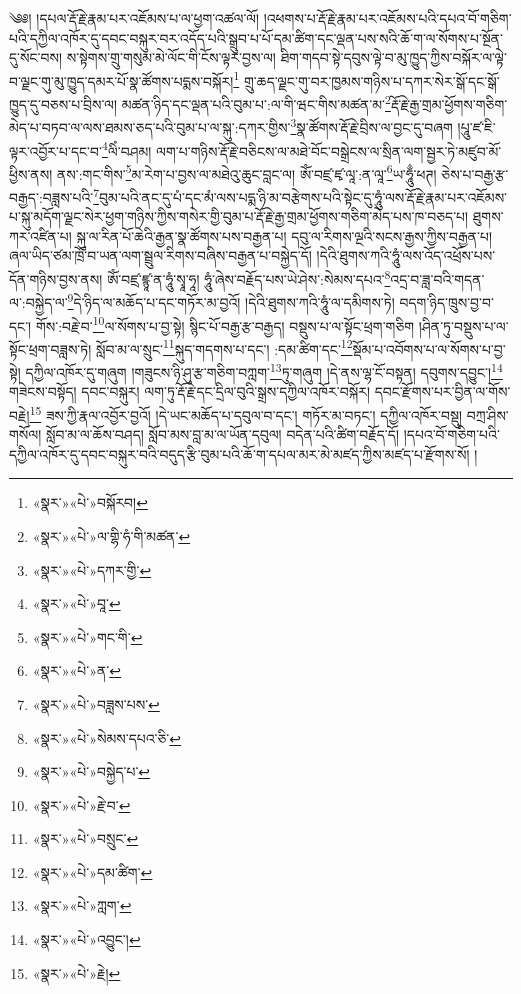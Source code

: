 ༄༅། །དཔལ་རྡོ་རྗེ་རྣམ་པར་འཇོམས་པ་ལ་ཕྱག་འཚལ་ལོ། །འཕགས་པ་རྡོ་རྗེ་རྣམ་པར་འཇོམས་པའི་དཔའ་བོ་གཅིག་པའི་དཀྱིལ་འཁོར་དུ་དབང་བསྐུར་བར་འདོད་པའི་སྒྲུབ་པ་པོ་དམ་ཚིག་དང་ལྡན་པས་སའི་ཆོ་ག་ལ་སོགས་པ་སྔོན་དུ་སོང་བས། ས་སྟེགས་གྲུ་གསུམ་མེ་ལོང་གི་ངོས་ལྟར་བྱས་ལ། ཐིག་གདབ་སྟེ་དབུས་ལྟེ་བ་མུ་ཁྱུད་ཀྱིས་བསྐོར་ལ་ལྟེ་བ་ལྗང་གུ་མུ་ཁྱུད་དམར་པོ་སྣ་ཚོགས་པདྨས་བསྐོར།\footnote{«སྣར་»«པེ་»བསྐོརབ།} གྲུ་ཆད་ལྗང་གུ་བར་ཁྱམས་གཉིས་པ་དཀར་སེར་སྒོ་དང་སྒོ་ཁྱུད་དུ་བཅས་པ་བྲིས་ལ། མཚན་ཉིད་དང་ལྡན་པའི་བུམ་པ་:ལ་གི་ཝང་གིས་མཚན་མ་\footnote{«སྣར་»«པེ་»ལ་གྷི་ཧཾ་གི་མཚན་}རྡོ་རྗེ་རྒྱ་གྲམ་ཕྱོགས་གཅིག་མེད་པ་བཏབ་ལ་ལས་ཐམས་ཅད་པའི་བུམ་པ་ལ་སྐུ་:དཀར་གྱིས་\footnote{«སྣར་»«པེ་»དཀར་གྱི་}སྣ་ཚོགས་རྡོ་རྗེ་བྲིས་ལ་བྱང་དུ་བཞག །པཱུ་ཛ་ཇི་ལྟར་འབྱོར་པ་དང་བ་\footnote{«སྣར་»«པེ་»བཱ་}ལིཾ་བཤམ། ལག་པ་གཉིས་རྡོ་རྗེ་བཅིངས་ལ་མཐེ་བོང་བསྒྲེངས་ལ་སྲིན་ལག་སྦྱར་ཏེ་མཛུབ་མོ་ཕྱིས་ནས། ནས་:གང་གིས་\footnote{«སྣར་»«པེ་»གང་གི་}མ་རེག་པ་བྱས་ལ་མཐེའུ་ཆུང་བླང་ལ། ཨོཾ་བཛྲ་ཛྭ་ལཱ་:ན་ལཱ་\footnote{«སྣར་»«པེ་»ན་}ཡ་ཧཱུྃ་ཕཊ། ཅེས་པ་བརྒྱ་རྩ་བརྒྱད་:བཟླས་པའི་\footnote{«སྣར་»«པེ་»བཟླས་པས་}བུམ་པའི་ནང་དུ་པཾ་དང་མཾ་ལས་པདྨ་ཉི་མ་བརྩེགས་པའི་སྟེང་དུ་ཧཱུཾ་ལས་རྡོ་རྗེ་རྣམ་པར་འཇོམས་པ་སྐུ་མདོག་ལྗང་སེར་ཕྱག་གཉིས་ཀྱིས་གསེར་གྱི་བུམ་པ་རྡོ་རྗེ་རྒྱ་གྲམ་ཕྱོགས་གཅིག་མེད་པས་ཁ་བཅད་པ། ཐུགས་ཀར་འཛིན་པ། སྐུ་ལ་རིན་པོ་ཆེའི་རྒྱན་སྣ་ཚོགས་པས་བརྒྱན་པ། དབུ་ལ་རིགས་ལྔའི་སངས་རྒྱས་ཀྱིས་བརྒྱན་པ། ཞལ་ཡིད་ཙམ་ཁྲོ་བ་ཡན་ལག་སྦྲུལ་རིགས་བཞིས་བརྒྱན་པ་བསྐྱེད་དོ། །དེའི་ཐུགས་ཀའི་ཧཱུཾ་ལས་འོད་འཕྲོས་པས་དོན་གཉིས་བྱས་ནས། ཨོཾ་བཛྲ་ཛྙཱ་ན་ཧཱུཾ་སྭཱ་ཧཱ། ཧཱུཾ་ཞེས་བརྗོད་པས་ཡེ་ཤེས་:སེམས་དཔའ་\footnote{«སྣར་»«པེ་»སེམས་དཔའ་ཅི་}འདྲ་བ་ཟླ་བའི་གདན་ལ་:བསྐྱེད་ལ་\footnote{«སྣར་»«པེ་»བསྐྱེད་པ་}དེ་ཉིད་ལ་མཆོད་པ་དང་གཏོར་མ་བྱའོ། །དེའི་ཐུགས་ཀའི་ཧཱུཾ་ལ་དམིགས་ཏེ། བདག་ཉིད་ཁྲུས་བྱ་བ་དང་། གོས་:བརྗེ་བ་\footnote{«སྣར་»«པེ་»རྗེ་བ་}ལ་སོགས་པ་བྱ་སྟེ། སྙིང་པོ་བརྒྱ་རྩ་བརྒྱད། བསྡུས་པ་ལ་སྟོང་ཕྲག་གཅིག །ཤིན་ཏུ་བསྡུས་པ་ལ་སྟོང་ཕྲག་བཟླས་ཏེ། སློབ་མ་ལ་སྲུང་\footnote{«སྣར་»«པེ་»བསྲུང་}སྐུད་གདགས་པ་དང་། :དམ་ཚིག་དང་\footnote{«སྣར་»«པེ་»དམ་ཚིག་}སྡོམ་པ་འབོགས་པ་ལ་སོགས་པ་བྱ་སྟེ། དཀྱིལ་འཁོར་དུ་གཞུག །གཟུངས་ཉི་ཤུ་རྩ་གཅིག་བཀླག་\footnote{«སྣར་»«པེ་»ཀླག་}ཏུ་གཞུག །དེ་ནས་ལྷ་ངོ་བསྟན། དབུགས་དབྱུང་།\footnote{«སྣར་»«པེ་»འབྱུང་།} གཟེངས་བསྟོད། དབང་བསྐུར། ལག་ཏུ་རྡོ་རྗེ་དང་དྲིལ་བུའི་སྒྲས་དཀྱིལ་འཁོར་བསྐོར། དབང་རྫོགས་པར་བྱིན་ལ་གོས་བརྗེ།\footnote{«སྣར་»«པེ་»རྗེ།} ཟས་ཀྱི་རྣལ་འབྱོར་བྱའོ། །དེ་ཡང་མཆོད་པ་དབུལ་བ་དང་། གཏོར་མ་བཏང་། དཀྱིལ་འཁོར་བསྡུ། བཀྲ་ཤིས་གསོལ། སློབ་མ་ལ་ཆོས་བཤད། སློབ་མས་བླ་མ་ལ་ཡོན་དབུལ། བདེན་པའི་ཚིག་བརྗོད་དོ། །དཔའ་བོ་གཅིག་པའི་དཀྱིལ་འཁོར་དུ་དབང་བསྐུར་བའི་བདུད་རྩི་བུམ་པའི་ཆོ་ག་དཔལ་མར་མེ་མཛད་ཀྱིས་མཛད་པ་རྫོགས་སོ། ། 